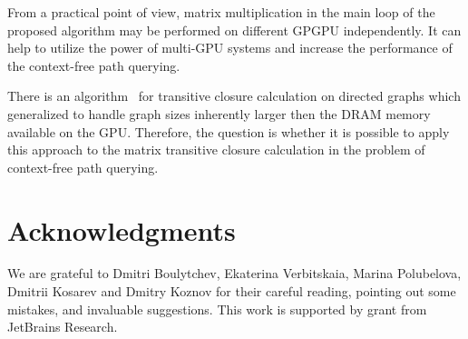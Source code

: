 \documentclass[runningheads,a4paper]{llncs}
\begin{document}
From a practical point of view, matrix multiplication in the main loop of the proposed algorithm may be performed on different GPGPU independently. It can help to utilize the power of multi-GPU systems and increase the performance of the context-free path querying.

There is an algorithm~\cite{apspGPU} for transitive closure calculation on directed graphs which generalized to handle graph sizes inherently larger then the DRAM memory available on the GPU. Therefore, the question is whether it is possible to apply this approach to the matrix transitive closure calculation in the problem of context-free path querying.

\section*{Acknowledgments}%

We are grateful to Dmitri Boulytchev, Ekaterina Verbitskaia, Marina Polubelova, Dmitrii Kosarev and Dmitry Koznov for their careful reading, pointing out some mistakes, and invaluable suggestions.
This work is supported by grant from JetBrains Research.




\end{document}
